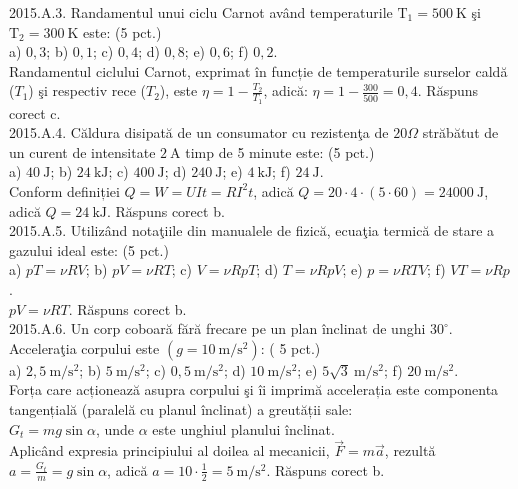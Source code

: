 2015.A.3. Randamentul unui ciclu Carnot având temperaturile $\mathrm{T}_{1}=500 \mathrm{~K}$ şi $\mathrm{T}_{2}=300 \mathrm{~K}$ este: (5 pct.)\\ a) $0,3$; b) $0,1$; c) $0,4$; d) $0,8$; e) $0,6$; f) $0,2$.\\ Randamentul ciclului Carnot, exprimat în funcție de temperaturile surselor caldă ($T_{1}$) şi respectiv rece ($T_{2}$), este $\eta=1-\frac{T_{2}}{T_{1}}$, adică: $\eta=1-\frac{300}{500}=0,4$. Răspuns corect c.\\

2015.A.4. Căldura disipată de un consumator cu rezistenţa de $20 \Omega$ străbătut de un curent de intensitate $2 \mathrm{~A}$ timp de 5 minute este: (5 pct.)\\ a) $40 \mathrm{~J}$; b) $24 \mathrm{~kJ}$; c) $400 \mathrm{~J}$; d) $240 \mathrm{~J}$; e) $4 \mathrm{~kJ}$; f) $24 \mathrm{~J}$.\\ Conform definiției $Q=W=U I t=R I^{2} t$, adică $Q=20 \cdot 4 \cdot(5 \cdot 60)=24000 \mathrm{~J}$, adică $Q=24 \mathrm{~kJ}$. Răspuns corect b.\\

2015.A.5. Utilizând notaţiile din manualele de fizică, ecuaţia termică de stare a gazului ideal este: (5 pct.)\\ a) $p T=\nu R V$; b) $p V=\nu R T$; c) $V=\nu R p T$; d) $T=\nu R p V$; e) $p=\nu R T V$; f) $V T=\nu R p$.\\ $p V=\nu R T$. Răspuns corect b.\\

2015.A.6. Un corp coboară fără frecare pe un plan înclinat de unghi $30^{\circ}$. Acceleraţia corpului este $\left(g=10 \mathrm{~m} / \mathrm{s}^{2}\right)$: ( 5 pct.)\\ a) $2,5 \mathrm{~m} / \mathrm{s}^{2}$; b) $5 \mathrm{~m} / \mathrm{s}^{2}$; c) $0,5 \mathrm{~m} / \mathrm{s}^{2}$; d) $10 \mathrm{~m} / \mathrm{s}^{2}$; e) $5 \sqrt{3} \mathrm{~m} / \mathrm{s}^{2}$; f) $20 \mathrm{~m} / \mathrm{s}^{2}$.\\ Forța care acționează asupra corpului şi îi imprimă accelerația este componenta tangențială (paralelă cu planul înclinat) a greutății sale:\\ $G_{t}=m g \sin \alpha$, unde $\alpha$ este unghiul planului înclinat.\\ Aplicând expresia principiului al doilea al mecanicii, $\vec{F}=m \vec{a}$, rezultă $a=\frac{G_{t}}{m}=g \sin \alpha$, adică $a=10 \cdot \frac{1}{2}=5 \mathrm{~m} / \mathrm{s}^{2}$. Răspuns corect b.\\

